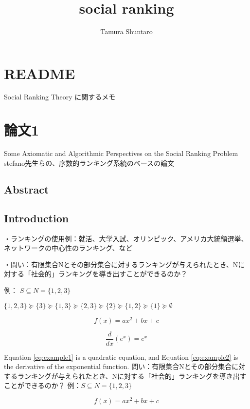 \documentclass{article}
\title{social ranking}
\author{Tamura Shuntaro}
\begin{document}
\maketitle

\section{README}

Social Ranking Theory に関するメモ

\section{論文1}
Some Axiomatic and Algorithmic Perspectives on the Social Ranking Problem
stefano先生らの、序数的ランキング系統のベースの論文

\subsection{Abstract}

\subsection{Introduction}
・ランキングの使用例：就活、大学入試、オリンピック、アメリカ大統領選挙、ネットワークの中心性のランキング、など


・問い：有限集合Nとその部分集合に対するランキングが与えられたとき、Nに対する「社会的」ランキングを導き出すことができるのか？


例：
$S\subseteq N = \{1,2,3\}$

$\{1,2,3\}\succeq \{3\}\succeq \{1,3\} \succeq \{2,3\}\succeq \{2\}\succeq \{1,2\}\succeq \{1\}\succeq \emptyset $

\begin{equation}
    \label{eq:example1}
    f(x) = ax^2 + bx + c
\end{equation}

\begin{equation}
    \label{eq:example2}
    \frac{d}{dx} \left( e^x \right) = e^x
\end{equation}

Equation \ref{eq:example1} is a quadratic equation, and Equation \ref{eq:example2} is the derivative of the exponential function.
問い：有限集合Nとその部分集合に対するランキングが与えられたとき、Nに対する「社会的」ランキングを導き出すことができるのか？
例：$S\subseteq N = \{1,2,3\}$

\begin{equation}
    \label{eq:example1}
    f(x) = ax^2 + bx + c
\end{equation}
\end{document}
